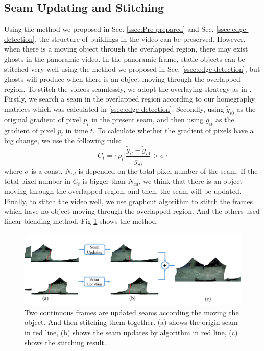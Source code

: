\documentclass[conference]{IEEEtran}
\begin{document}
\subsection{Seam Updating and Stitching}
\label{ssec:stitching}

Using the method we proposed in Sec. \ref{ssec:Pre-prepared} and Sec. \ref{ssec:edge-detection}, the structure of buildings in the video can be preserved. However, when there is a moving object
through the overlapped region, there may exist ghosts in the panoramic video. 
In the panoramic frame, static objects can be stitched very well using the method we proposed in Sec. \ref{ssec:edge-detection}, 
but ghosts will produce when there is an object moving through the overlapped region. To stitch the videos seamlessly,
we adopt the overlaying strategy as in \cite{he2016parallax}. Firstly, we search a seam in the overlapped region according to our homegraphy matrices which was calculated in \ref{ssec:edge-detection}.
Secondly, using $\widetilde{g}_{i0}$ as the original gradient of pixel $p_i$ in the present seam, and then using $\widetilde{g}_{it}$ as the gradient of pixel $p_i$ in time $t$. 
To calculate whether the gradient of pixels have a big change, we use the following rule:
\begin{equation}
\textit{C}_{t}=\{p_{i}|\frac{\widetilde{g}_{it}-\widetilde{g}_{i0}}{\widetilde{g}_{i0}}>\sigma\}
\end{equation}
where $\sigma$ is a const, $\textit{N}_{cd}$ is depended on the total pixel number of the seam. If the total pixel number in $\textit{C}_t$ is bigger than $\textit{N}_{cd}$, 
we think that there is an object moving through the overlapped region, and then, the seam will be updated. Finally, to stitch the video well, 
we use graphcut algorithm \cite{boykov2004experimental} to stitch the frames which have no object moving through the overlapped region. 
And the others used linear blending method.
Fig \ref{fig:p24} shows the method.
\begin{figure}[h]
\centering
\includegraphics[scale=0.25]{picture43.png}
\caption{Two continuous frames are updated seams according the moving the object. And then stitching them together. (a) shows the origin seam in red line, (b) shows the seam updates 
by algorithm \cite{he2016parallax} in red line,
(c) shows the stitching result.}
\label{fig:p24}
\end{figure}
\end{document}
